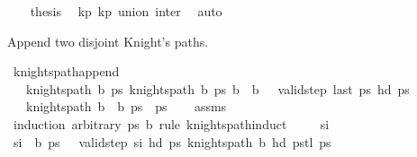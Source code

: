 \begin{isabellebody}
\ \ \isamarkupfalse%
\ {\isacharquery}{\kern0pt}thesis\ \isamarkupfalse%
\ kp{}\ kp{}\ union\ inter\ \isamarkupfalse%
\ auto\isanewline
{}\isamarkupfalse%
%
\endisatagproof
{\isafoldproof}%
%
\isadelimproof
%
\endisadelimproof
%
\begin{isamarkuptext}%
Append two disjoint Knight's paths.%
\end{isamarkuptext}\isamarkuptrue%
\isamarkupfalse%
\ knights{\isacharunderscore}{\kern0pt}path{\isacharunderscore}{\kern0pt}append{\isacharcolon}{\kern0pt}\ \ \ \ \ \ \ \ \ \ \ \ \ \isanewline
\ \ \ {\isachardoublequoteopen}knights{\isacharunderscore}{\kern0pt}path\ b\ ps\ {\isachardoublequoteopen}knights{\isacharunderscore}{\kern0pt}path\ b\ ps\ {\isachardoublequoteopen}b\ {\isasyminter}\ b\ {\isacharequal}{\kern0pt}\ {\isacharbraceleft}{\kern0pt}{\isacharbraceright}{\kern0pt}{\isachardoublequoteclose}\ {\isachardoublequoteopen}valid{\isacharunderscore}{\kern0pt}step\ {\isacharparenleft}{\kern0pt}last\ ps\ {\isacharparenleft}{\kern0pt}hd\ ps\isanewline
\ \ \ {\isachardoublequoteopen}knights{\isacharunderscore}{\kern0pt}path\ {\isacharparenleft}{\kern0pt}b\ {\isasymunion}\ b\ {\isacharparenleft}{\kern0pt}ps\ {\isacharat}{\kern0pt}\ ps\isanewline
%
\isadelimproof
\ \ %
\endisadelimproof
%
\isatagproof
{}\isamarkupfalse%
\ assms\isanewline
{}\isamarkupfalse%
\ {\isacharparenleft}{\kern0pt}induction\ arbitrary{\isacharcolon}{\kern0pt}\ ps\ b\ rule{\isacharcolon}{\kern0pt}\ knights{\isacharunderscore}{\kern0pt}path{\isachardot}{\kern0pt}induct{\isacharparenright}{\kern0pt}\isanewline
\ \ \isamarkupfalse%
\ {\isacharparenleft}{\kern0pt}{}\ s\isactrlsub i{\isacharparenright}{\kern0pt}\isanewline
\ \ \isamarkupfalse%
\ \isamarkupfalse%
\ {\isachardoublequoteopen}s\isactrlsub i\ {\isasymnotin}\ b\ {\isachardoublequoteopen}ps\ {\isasymnoteq}\ {\isacharbrackleft}{\kern0pt}{\isacharbrackright}{\kern0pt}{\isachardoublequoteclose}\ {\isachardoublequoteopen}valid{\isacharunderscore}{\kern0pt}step\ s\isactrlsub i\ {\isacharparenleft}{\kern0pt}hd\ ps\ {\isachardoublequoteopen}knights{\isacharunderscore}{\kern0pt}path\ b\ {\isacharparenleft}{\kern0pt}hd\ pstl\ ps\ \isanewline

\end{isabellebody}
